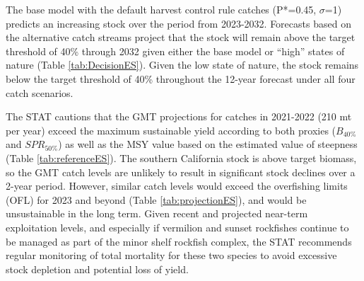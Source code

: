 \documentclass[11pt,
  english,
  a4paper,
]{article}
\begin{document}
The base model with the default harvest control rule catches (P*=0.45, {\(\sigma\)\leavevmode\tagmcend\tagstructend}=1) predicts an increasing stock over the period from 2023-2032. Forecasts based on the alternative catch streams project that the stock will remain above the target threshold of 40\% through 2032 given either the base model or ``high'' states of nature (Table \ref{tab:DecisionES}). Given the low state of nature, the stock remains below the target threshold of 40\% throughout the 12-year forecast under all four catch scenarios.

The STAT cautions that the GMT projections for catches in 2021-2022 (210 mt per year) exceed the maximum sustainable yield according to both proxies ({\(B_{40\%}\)\leavevmode\tagmcend\tagstructend} and {\(SPR_{50\%}\)\leavevmode\tagmcend\tagstructend}) as well as the MSY value based on the estimated value of steepness (Table \ref{tab:referenceES}). The southern California stock is above target biomass, so the GMT catch levels are unlikely to result in significant stock declines over a 2-year period. However, similar catch levels would exceed the overfishing limits (OFL) for 2023 and beyond (Table \ref{tab:projectionES}), and would be unsustainable in the long term. Given recent and projected near-term exploitation levels, and especially if vermilion and sunset rockfishes continue to be managed as part of the minor shelf rockfish complex, the STAT recommends regular monitoring of total mortality for these two species to avoid excessive stock depletion and potential loss of yield.
\end{document}
